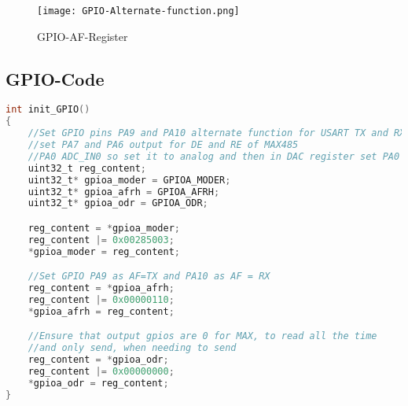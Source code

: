 \newpage
    \begin{figure}[!htb]
        \centering
        \texttt{[image: GPIO-Alternate-function.png]}
        \caption{GPIO-AF-Register}
        \label{caption:GPIO-AF-Register}
    \end{figure}
        
\newpage
\subsection{GPIO-Code}
    \begin{lstlisting}[language=C, style=CStyle, caption=GPIO-Code, captionpos=b, label=GPIO-Code]
int init_GPIO()
{
    //Set GPIO pins PA9 and PA10 alternate function for USART TX and RX, 
    //set PA7 and PA6 output for DE and RE of MAX485 
    //PA0 ADC_IN0 so set it to analog and then in DAC register set PA0 as ADC_IN0 
    uint32_t reg_content;
    uint32_t* gpioa_moder = GPIOA_MODER;
    uint32_t* gpioa_afrh = GPIOA_AFRH;
    uint32_t* gpioa_odr = GPIOA_ODR;

    reg_content = *gpioa_moder;
    reg_content |= 0x00285003;
    *gpioa_moder = reg_content;

    //Set GPIO PA9 as AF=TX and PA10 as AF = RX
    reg_content = *gpioa_afrh;
    reg_content |= 0x00000110;
    *gpioa_afrh = reg_content;

    //Ensure that output gpios are 0 for MAX, to read all the time
    //and only send, when needing to send
    reg_content = *gpioa_odr;
    reg_content |= 0x00000000;
    *gpioa_odr = reg_content;  
}
    \end{lstlisting}
        
    
    
    




    
